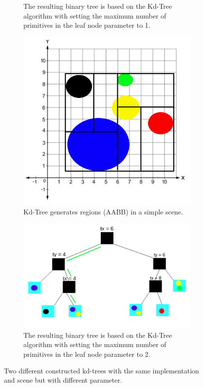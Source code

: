 \documentclass[11pt,a4paper]{article}
\begin{document}
\begin{figure}[H]
\begin{subfigure}[b]{0.6\textwidth}
         \caption{The resulting binary tree is based on the Kd-Tree algorithm with setting the maximum number of primitives in the leaf node parameter to 1.}
         \label{fig:pi_5000}
     \end{subfigure}
     \hfill
     \begin{subfigure}[b]{0.3\textwidth}
         \centering
         \includegraphics[width=\textwidth]{images/kdtree/visaul_scene_2.png}
         \caption{Kd-Tree generates regions (AABB) in a simple scene.}
         \label{fig:pi_5000}
     \end{subfigure}
     \hfill
     \begin{subfigure}[b]{0.6\textwidth}
         \centering
         \includegraphics[width=\textwidth]{images/kdtree/visual_tree_2_green.png}
         \caption{The resulting binary tree is based on the Kd-Tree algorithm with setting the maximum number of primitives in the leaf node parameter to 2.
}
         \label{fig:pi_5000}
     \end{subfigure}
        \caption{Two different constructed kd-trees with the same implementation and scene but with different parameter.}
        \label{fig:three graphs}
\end{figure}
\end{document}
